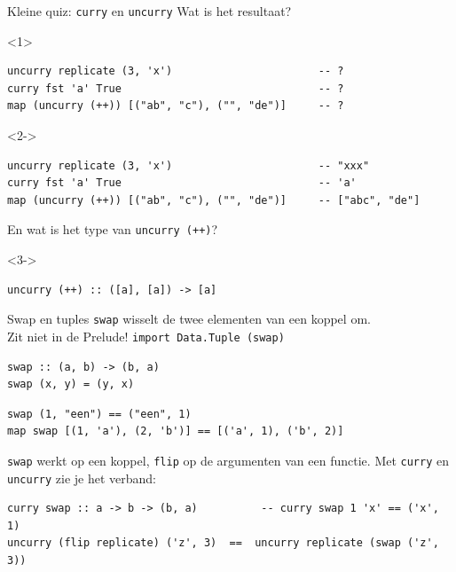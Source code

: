 \documentclass[aspectratio=169,11pt]{beamer}
\newcommand{\hs}{\lstinline[style=hsinline]}
\begin{document}
\begin{frame}[fragile]{Kleine quiz: \texttt{curry} en \texttt{uncurry}}
  Wat is het resultaat?
  \begin{onlyenv}<1>
  \begin{lstlisting}
uncurry replicate (3, 'x')                       -- ?
curry fst 'a' True                               -- ?
map (uncurry (++)) [("ab", "c"), ("", "de")]     -- ?
\end{lstlisting}
\end{onlyenv}
\begin{onlyenv}<2->
\begin{lstlisting}
uncurry replicate (3, 'x')                       -- "xxx"
curry fst 'a' True                               -- 'a'
map (uncurry (++)) [("ab", "c"), ("", "de")]     -- ["abc", "de"]
\end{lstlisting}
\end{onlyenv}
  \medskip
  En wat is het \alert{type} van \hs|uncurry (++)|?
\begin{uncoverenv}<3->
\begin{lstlisting}
uncurry (++) :: ([a], [a]) -> [a]
\end{lstlisting}
\end{uncoverenv}
\end{frame}

\begin{frame}[fragile]{Swap en tuples}
  \hs|swap| wisselt de twee elementen van een \alert{koppel} om.\\
  Zit niet in de Prelude! \hs|import Data.Tuple (swap)|

\begin{lstlisting}
swap :: (a, b) -> (b, a)
swap (x, y) = (y, x)
\end{lstlisting}
\begin{lstlisting}
swap (1, "een") == ("een", 1)
map swap [(1, 'a'), (2, 'b')] == [('a', 1), ('b', 2)]
\end{lstlisting}
\pause
\hs|swap| werkt op een \alert{koppel}, \hs|flip| op de \alert{argumenten van een functie}.
Met \hs|curry| en \hs|uncurry| zie je het verband:
\begin{lstlisting}
curry swap :: a -> b -> (b, a)          -- curry swap 1 'x' == ('x', 1)
uncurry (flip replicate) ('z', 3)  ==  uncurry replicate (swap ('z', 3))
\end{lstlisting}
\end{frame}
\end{document}
